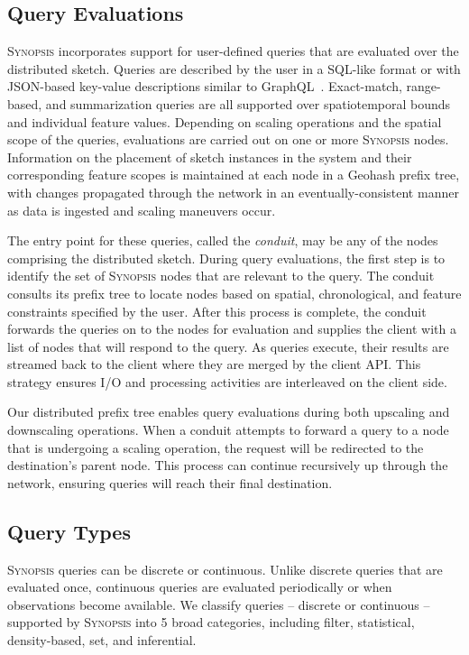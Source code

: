 \subsection{Query Evaluations}
\label{subsec:query-eval}
\textsc{Synopsis} incorporates support for user-defined queries that are evaluated over the distributed sketch.  Queries are described by the user in a SQL-like format or with JSON-based key-value descriptions similar to GraphQL~\cite{graphql}. Exact-match, range-based, and summarization queries are all supported over spatiotemporal bounds and individual feature values. Depending on scaling operations and the spatial scope of the queries, evaluations are carried out on one or more \textsc{Synopsis} nodes. Information on the placement of sketch instances in the system and their corresponding feature scopes is maintained at each node in a Geohash prefix tree, with changes propagated through the network in an eventually-consistent manner as data is ingested and scaling maneuvers occur.

The entry point for these queries, called the \emph{conduit}, may be any of the nodes comprising the distributed sketch. During query evaluations, the first step is to identify the set of \textsc{Synopsis} nodes that are relevant to the query. The conduit consults its prefix tree to locate nodes based on spatial, chronological, and feature constraints specified by the user. After this process is complete, the conduit forwards the queries on to the nodes for evaluation and supplies the client with a list of nodes that will respond to the query. As queries execute, their results are streamed back to the client where they are merged by the client API. This strategy ensures I/O and processing activities are interleaved on the client side.

Our distributed prefix tree enables query evaluations during both upscaling and downscaling operations. When a conduit attempts to forward a query to a node that is undergoing a scaling operation, the request will be redirected to the destination's parent node. This process can continue recursively up through the network, ensuring queries will reach their final destination.

\subsection{Query Types}
\textsc{Synopsis} queries can be discrete or continuous. Unlike discrete queries that are evaluated once, continuous queries are evaluated periodically or when observations become available. We classify queries -- discrete or continuous -- supported by \textsc{Synopsis} into 5 broad categories, including filter, statistical, density-based, set, and inferential.

